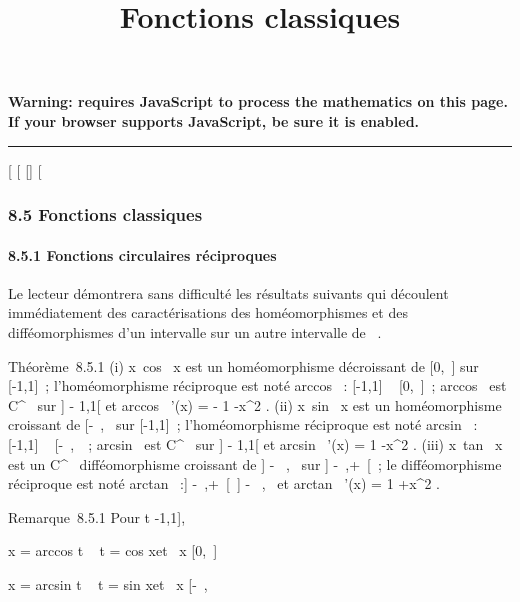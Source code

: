 \documentclass[]{article}
\title{Fonctions classiques}
\author{}
\date{}
\begin{document}
\maketitle

\textbf{Warning: 
requires JavaScript to process the mathematics on this page.\\ If your
browser supports JavaScript, be sure it is enabled.}

\begin{center}\rule{3in}{0.4pt}\end{center}

{[}
{[}
{[}{]}
{[}

\subsubsection{8.5 Fonctions classiques}

\paragraph{8.5.1 Fonctions circulaires réciproques}

Le lecteur démontrera sans difficulté les résultats suivants qui
découlent immédiatement des caractérisations des homéomorphismes et des
difféomorphismes d'un intervalle sur un autre intervalle de ~.

Théorème~8.5.1 (i)
x\mapsto~cos~ x est un
homéomorphisme décroissant de {[}0,\pi~{]} sur {[}-1,1{]}~;
l'homéomorphisme réciproque est noté arccos~ :
{[}-1,1{]} \rightarrow~ {[}0,\pi~{]}~; arccos~ est
C^\infty~ sur {]} - 1,1{[} et arccos~ '(x)
= - 1 \over {}-x^2
. (ii) x\mapsto~sin~ x est
un homéomorphisme croissant de {[}-\pi~,\pi~\diagup2{]} sur {[}-1,1{]}~;
l'homéomorphisme réciproque est noté arcsin~ :
{[}-1,1{]} \rightarrow~ {[}-\pi~,\pi~\diagup2{]}~; arcsin~ est
C^\infty~ sur {]} - 1,1{[} et arcsin~ '(x)
= 1 \over {}-x^2 .
(iii) x\mapsto~tan~ x est
un C^\infty~ difféomorphisme croissant de {]} - \pi~,\pi~\diagup2{[} sur {]}
-\infty~,+\infty~{[}~; le difféomorphisme réciproque est noté
arctan~ :{]} -\infty~,+\infty~{[}\rightarrow~{]} - \pi~,\pi~\diagup2{[} et
arctan~ '(x) = 1 +x^2 .

Remarque~8.5.1 Pour t \in {[}-1,1{]},

x = arccos t \mathrel\Leftrightarrow~ t
= cos x\text et ~x \in
{[}0,\pi~{]}

x = arcsin t \mathrel\Leftrightarrow~ t
= sin x\text et ~x \in
{[}-\pi~,\pi~\diagup2{]}
\end{document}
